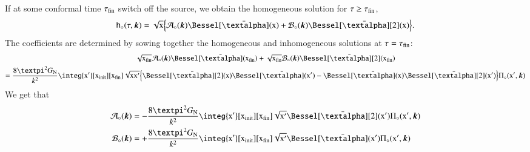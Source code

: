 {    If at some conformal time $\tau_\mathrm{fin}$ switch off the source, we obtain the homogeneous solution for $\tau \geq \tau_\mathrm{fin}$,
    \begin{equation}
        \mathsf{h}_\circ (\tau, \vec{k}) = \sqrt{\ktau} \cclosed{\mathcal{A}_\circ (\vec{k}) \Bessel[\nuu](\ktau) +  \mathcal{B}_\circ (\vec{k}) \Bessel[\nuu][2](\ktau)}.
    \end{equation}
    The coefficients are determined by sowing together the homogeneous and inhomogeneous solutions at $\tau=\tau_\mathrm{fin}$:
    \begin{multline}
        \sqrt{\ktau\ped{fin}} \mathcal{A}_\circ (\vec{k}) \Bessel[\nuu](\ktau\ped{fin}) +  \sqrt{\ktau\ped{fin}} \mathcal{B}_\circ (\vec{k}) \Bessel[\nuu][2](\ktau\ped{fin}) \\= \frac{8\ppi^2 G\ped{N}}{k^2}  \integ{\ktau'}[\ktau\ped{init}][\ktau\ped{fin}] \sqrt{\ktau \ktau'} \cclosed{ \Bessel[\nuu][2](\ktau)\Bessel[\nuu](\ktau') - \Bessel[\nuu](\ktau)\Bessel[\nuu][2](\ktau') }
        \aT_\circ(\ktau',\vec{k} )
    \end{multline}
    We get that
    \begin{equation}
        \begin{split}
            \mathcal{A}_\circ (\vec{k}) &= - \frac{8\ppi^2 G\ped{N}}{k^2}  \integ{\ktau'}[\ktau\ped{init}][\ktau\ped{fin}] \sqrt{\ktau'}\Bessel[\nuu][2](\ktau') 
            \aT_\circ(\ktau',\vec{k} ) \\
            \mathcal{B}_\circ (\vec{k}) &= + \frac{8\ppi^2 G\ped{N}}{k^2}  \integ{\ktau'}[\ktau\ped{init}][\ktau\ped{fin}] \sqrt{\ktau'}\Bessel[\nuu](\ktau') 
            \aT_\circ(\ktau',\vec{k} ) \\
        \end{split}
    \end{equation}
    
    } %

